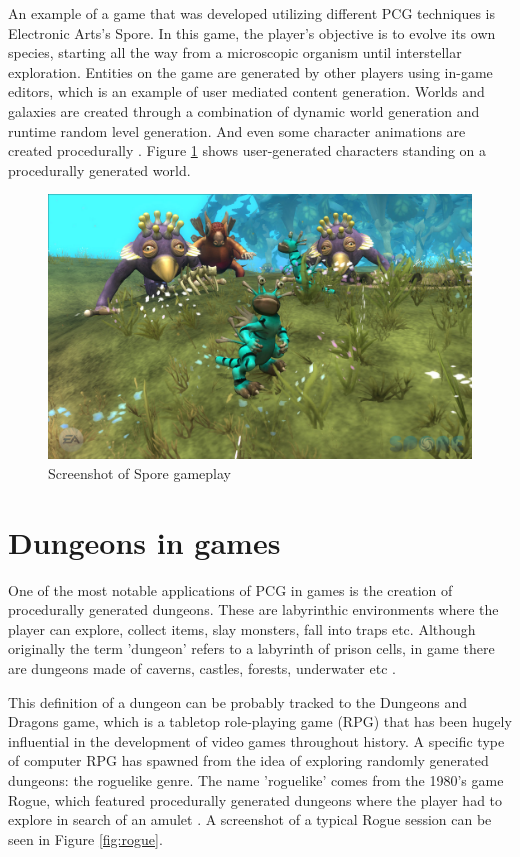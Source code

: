 An example of a game that was developed utilizing different PCG techniques is Electronic Arts's Spore. In this game, the player's objective is to evolve its own species, starting all the way from a microscopic organism until interstellar exploration. Entities on the game are generated by other players using in-game editors, which is an example of user mediated content generation. Worlds and galaxies are created through a combination of dynamic world generation and runtime random level generation. And even some character animations are created procedurally \cite{wright:2007}. Figure \ref{fig:spore} shows user-generated characters standing on a procedurally generated world.

\begin{figure}[h]
    \caption{Screenshot of Spore gameplay}
    \centerline{\includegraphics[width=13cm]{images/introduction/spore.jpg}}
    \label{fig:spore}
\end{figure}


\section{Dungeons in games}

One of the most notable applications of PCG in games is the creation of procedurally generated dungeons. These are labyrinthic environments where the player can explore, collect items, slay monsters, fall into traps etc. Although originally the term 'dungeon' refers to a labyrinth of prison cells, in game there are dungeons made of caverns, castles, forests, underwater etc \cite{shaker:2016}. 

This definition of a dungeon can be probably tracked to the Dungeons and Dragons game, which is a tabletop role-playing game (RPG) that has been hugely influential in the development of video games throughout history. A specific type of computer RPG has spawned from the idea of exploring randomly generated dungeons: the roguelike genre. The name 'roguelike' comes from the 1980's game Rogue, which featured procedurally generated dungeons where the player had to explore in search of an amulet \cite{brewer:2016}. A screenshot of a typical Rogue session can be seen in Figure \ref{fig:rogue}.

